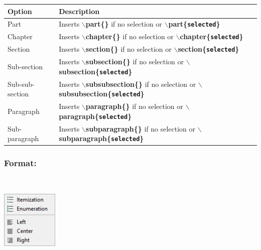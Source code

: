\begin{scriptsize}
  \begin{tabularx}{\textwidth}{>{\hsize=0.2\hsize}X>{\hsize=0.8\hsize}X}\\
    \hline
    \textbf{Option} & \textbf{Description} \\
    \hline
    Part & Inserts \textbf{$\backslash$part\{\}} if no selection or
     \textbf{$\backslash$part\{\texttt{selected}\}} \\
    Chapter & Inserts \textbf{$\backslash$chapter\{\}} if no selection or
     \textbf{$\backslash$chapter\{\texttt{selected}\}} \\
    Section & Inserts \textbf{$\backslash$section\{\}} if no selection or
     \textbf{$\backslash$section\{\texttt{selected}\}} \\
    Sub-section & Inserts \textbf{$\backslash$subsection\{\}} if no selection or
     \textbf{$\backslash$subsection\{\texttt{selected}\}} \\
    Sub-sub-section & Inserts \textbf{$\backslash$subsubsection\{\}} if no selection or
     \textbf{$\backslash$subsubsection\{\texttt{selected}\}} \\
    Paragraph & Inserts \textbf{$\backslash$paragraph\{\}} if no selection or
     \textbf{$\backslash$paragraph\{\texttt{selected}\}} \\
    Sub-paragraph & Inserts \textbf{$\backslash$subparagraph\{\}} if no selection or
     \textbf{$\backslash$subparagraph\{\texttt{selected}\}} \\
    \hline
  \end{tabularx}
\end{scriptsize}


\hypertarget{menu_insert_latex_format}{}
\subsubsection{Format:}\\

\includegraphics[scale=0.50]{./res/menu_insert_latex_format.png}\\

